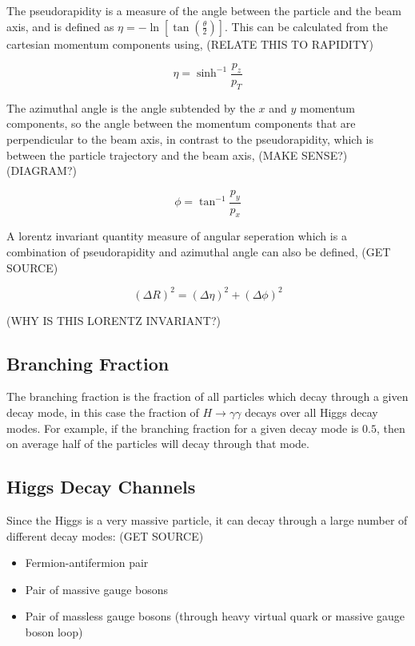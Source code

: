 \documentclass[11pt]{amsart}
\begin{document}
\begin{multicols}{2}
The pseudorapidity is a measure of the angle between the particle and the beam axis, and is defined as $\eta = -\ln{\left[\tan{\left(\frac{\theta}{2}\right)}\right]}$. This can be calculated from the cartesian momentum components using, (RELATE THIS TO RAPIDITY)

\begin{equation}
  \label{eq:pseudorapidity}
  \eta = \sinh^{-1} \frac{p_z}{p_T}
\end{equation}

The azimuthal angle is the angle subtended by the $x$ and $y$ momentum components, so the angle between the momentum components that are perpendicular to the beam axis, in contrast to the pseudorapidity, which is between the particle trajectory and the beam axis, (MAKE SENSE?) (DIAGRAM?)

\begin{equation}
  \label{eq:azimuthal}
  \phi = \tan^{-1} \frac{p_y}{p_x}
\end{equation}

A lorentz invariant quantity measure of angular seperation which is a combination of pseudorapidity and azimuthal angle can also be defined, (GET SOURCE)

\begin{equation}
  \label{eq:angular}
  {(\Delta R)}^2 = {(\Delta \eta)}^2 + {(\Delta \phi)}^2
\end{equation}

(WHY IS THIS LORENTZ INVARIANT?)

\subsection{Branching Fraction}
\label{sec:branching}

The branching fraction is the fraction of all particles which decay through a given decay mode, in this case the fraction of $H \to \gamma\gamma$ decays over all Higgs decay modes. For example, if the branching fraction for a given decay mode is $0.5$, then on average half of the particles will decay through that mode.

\subsection{Higgs Decay Channels}

Since the Higgs is a very massive particle, it can decay through a large number of different decay modes: (GET SOURCE)

\begin{itemize}
    \item Fermion-antifermion pair
    \item Pair of massive gauge bosons
    \item Pair of massless gauge bosons (through heavy virtual quark or massive gauge boson loop)
\end{itemize}


\end{multicols}
\end{document}
